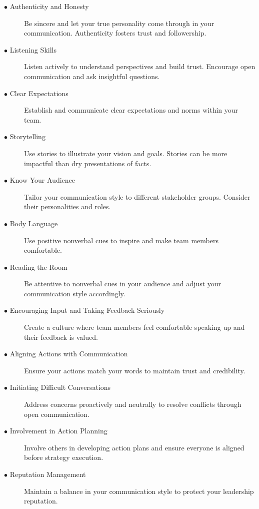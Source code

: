 \documentclass[runningheads]{llncs}
\begin{document}
\begin{description}
 \item [$\bullet$ Authenticity and Honesty] Be sincere and let your true personality come through in your communication. Authenticity fosters trust and followership.\\
 \item [$\bullet$ Listening Skills] Listen actively to understand perspectives and build trust. Encourage open communication and ask insightful questions.\\
 \item [$\bullet$ Clear Expectations] Establish and communicate clear expectations and norms within your team.\\
 \item [$\bullet$ Storytelling] Use stories to illustrate your vision and goals. Stories can be more impactful than dry presentations of facts.\\
 \item [$\bullet$ Know Your Audience] Tailor your communication style to different stakeholder groups. Consider their personalities and roles.\\
 \item [$\bullet$ Body Language] Use positive nonverbal cues to inspire and make team members comfortable.\\
 \item [$\bullet$ Reading the Room] Be attentive to nonverbal cues in your audience and adjust your communication style accordingly.\\
 \item [$\bullet$ Encouraging Input and Taking Feedback Seriously] Create a culture where team members feel comfortable speaking up and their feedback is valued.\\
 \item [$\bullet$ Aligning Actions with Communication] Ensure your actions match your words to maintain trust and credibility.\\
 \item [$\bullet$ Initiating Difficult Conversations] Address concerns proactively and neutrally to resolve conflicts through open communication.\\
 \item [$\bullet$ Involvement in Action Planning] Involve others in developing action plans and ensure everyone is aligned before strategy execution.\\
 \item [$\bullet$ Reputation Management] Maintain a balance in your communication style to protect your leadership reputation.\\

\end{description}
 
\end{document}
